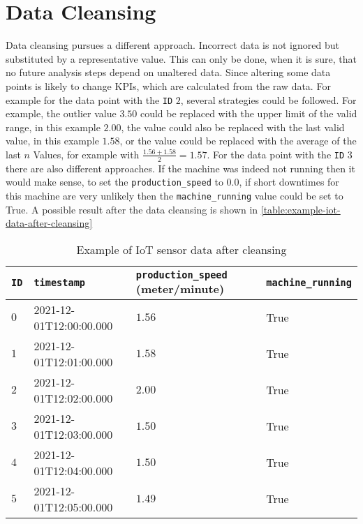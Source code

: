 \section{Data Cleansing}
Data cleansing pursues a different approach. Incorrect data is not ignored but substituted by a representative value. This can only be done, when it is sure, that no future analysis steps depend on unaltered data. Since altering some data points is likely to change \acp{KPI}, which are calculated from the raw data.
For example for the data point with the \verb|ID| $2$, several strategies could be followed. For example, the outlier value $3.50$ could be replaced with the upper limit of the valid range, in this example $2.00$, the value could also be replaced with the last valid value, in this example $1.58$, or the value could be replaced with the average of the last $n$ Values, for example with $\frac{1.56+1.58}{2} = 1.57$. For the data point with the \verb|ID| $3$ there are also different approaches. If the machine was indeed not running then it would make sense, to set the \verb|production_speed| to $0.0$, if short downtimes for this machine are very unlikely then the \verb|machine_running| value could be set to True. A possible result after the data cleansing is shown in \autoref{table:example-iot-data-after-cleansing} \cite{maleticDataCleansingIntegrity2000}
\begin{table}[ht]
\begin{tabular}{|l|l|l|l|}
\hline
\verb|ID| & \verb|timestamp|        & \verb|production_speed| (meter/minute) & \verb|machine_running| \\ \hline
$0$       & 2021-12-01T12:00:00.000 & $1.56$                                 & True                   \\ \hline
$1$       & 2021-12-01T12:01:00.000 & $1.58$                                 & True                   \\ \hline
$2$       & 2021-12-01T12:02:00.000 & $2.00$                                 & True                   \\ \hline
$3$       & 2021-12-01T12:03:00.000 & $1.50$                                 & True                   \\ \hline
$4$       & 2021-12-01T12:04:00.000 & $1.50$                                 & True                   \\ \hline
$5$       & 2021-12-01T12:05:00.000 & $1.49$                                 & True                   \\ \hline
\end{tabular}
\caption{Example of IoT sensor data after cleansing}
\label{table:example-iot-data-after-cleansing}
\end{table}